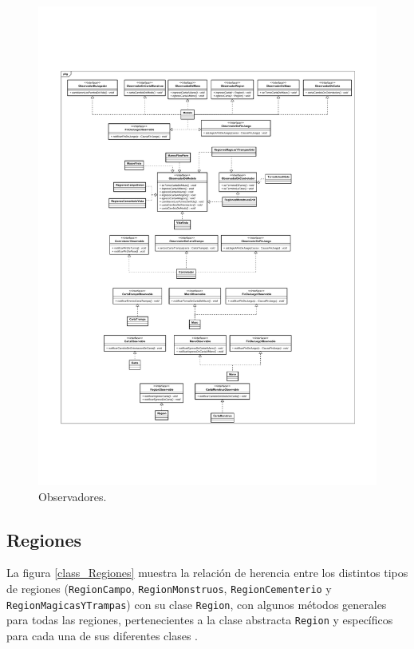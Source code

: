 	\begin{figure}[H]
		\centering
		\includegraphics[scale=0.8]{includes/class_Observadores}
		\caption{Observadores.}
		\label{class_Observadores}
	\end{figure}
	
	\subsection{Regiones}
	
	La figura \ref{class_Regiones} muestra la relación de herencia entre los distintos tipos de regiones (\texttt{RegionCampo}, \texttt{RegionMonstruos}, \texttt{RegionCementerio} y \texttt{RegionMagicasYTrampas}) con su clase  \texttt{Region}, con algunos métodos generales para todas las regiones, pertenecientes a la clase abstracta \texttt{Region} y específicos para cada una de sus diferentes clases .
	
